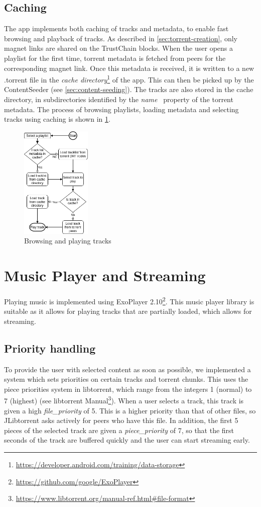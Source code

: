 \subsection{Caching}
The app implements both caching of tracks and metadata, to enable fast browsing and playback of tracks. As described in \ref{sec:torrent-creation}, only magnet links are shared on the TrustChain blocks. When the user opens a playlist for the first time, torrent metadata is fetched from peers for the corresponding magnet link. Once this metadata is received, it is written to a new .torrent file in the \textit{cache directory}\footnote{\url{https://developer.android.com/training/data-storage}} of the app. This can then be picked up by the ContentSeeder (see \ref{sec:content-seeding}). The tracks are also stored in the cache directory, in subdirectories identified by the \textit{name}~\citep{bittorrentbep3} property of the torrent metadata. The process of browsing playlists, loading metadata and selecting tracks using caching is shown in \ref{fig:playing-tracks}.
\begin{figure}
    \includegraphics[width=0.3\textwidth]{implementation/playing_track.png}
    \caption{Browsing and playing tracks}
    \label{fig:playing-tracks}
\end{figure}

\section{Music Player and Streaming}
Playing music is implemented using ExoPlayer 2.10\footnote{\url{https://github.com/google/ExoPlayer}}. This music player library is suitable as it allows for playing tracks that are partially loaded, which allows for streaming.
\subsection{Priority handling}
To provide the user with selected content as soon as possible, we implemented a system which sets priorities on certain tracks and torrent chunks. This uses the piece priorities system in libtorrent, which range from the integers 1 (normal) to 7 (highest) (see libtorrent Manual\footnote{\url{https://www.libtorrent.org/manual-ref.html\#file-format}}). When a user selects a track, this track is given a high \textit{file\_priority} of 5. This is a higher priority than that of other files, so JLibtorrent asks actively for peers who have this file. In addition, the first 5  pieces of the selected track are given a \textit{piece\_priority} of 7, so that the first seconds of the track are buffered quickly and the user can start streaming early.
